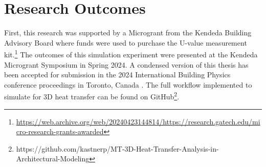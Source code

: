 \section*{Research Outcomes}
First, this research was supported by a Microgrant from the Kendeda Building Advisory Board  \cite{kendeda} where funds were used to purchase the U-value measurement kit.\footnote{\url{https://web.archive.org/web/20240423144814/https://research.gatech.edu/micro-research-grants-awarded}}
The outcomes of this simulation experiment were presented at the Kendeda Microgrant Symposium in Spring 2024. 
A condensed version of this thesis has been accepted for submission in the 2024 International Building Physics conference proceedings in Toronto, Canada \cite{ibpc}. The full workflow implemented to simulate for 3D heat transfer can be found on GitHub\footnote{https://github.com/kastnerp/MT-3D-Heat-Transfer-Analysis-in-Architectural-Modeling}.




